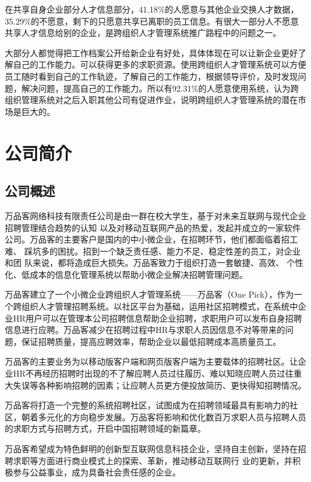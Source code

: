 \documentclass[UTF8]{ctexart}
\begin{document}
在共享自身企业部分人才信息部分，41.18\%的人愿意与其他企业交换人才数据，35.29\%的不愿意，剩下的只愿意共享已离职的员工信息。有很大一部分人不愿意共享人才信息给别的企业，是跨组织人才管理系统推广路程中的问题之一。

大部分人都觉得把工作档案公开给新企业有好处，具体体现在可以让新企业更好了解自己的工作能力。可以获得更多的求职资源。使用跨组织人才管理系统可以方便员工随时看到自己的工作轨迹，了解自己的工作能力，根据领导评价，及时发现问题，解决问题，提高自己的工作能力。所以有92.31\%的人愿意使用系统，认为跨组织管理系统对之后入职其他公司有促进作业，说明跨组织人才管理系统的潜在市场是巨大的。

\newpage\section{公司简介}
\subsection{公司概述}
万品客网络科技有限责任公司是由一群在校大学生，基于对未来互联网与现代企业招聘管理结合趋势的认知 以及对移动互联网产品的热爱，发起并成立的一家软件公司。万品客的主要客户是国内的中小微企业，在招聘环节，他们都面临着招工难、 踩坑多的困扰。招到一个缺乏责任感、能力不足、稳定性差的员工，对企业和团 队来说，都将造成巨大损失。万品客致力于组织打造一套敏捷、高效、 个性化、低成本的信息化管理系统以帮助小微企业解决招聘管理问题。

万品客建立了一个小微企业跨组织人才管理系统——万品客（One Pick），作为一个跨组织人才管理招聘系统。以社区平台为基础，运用社区招聘模式，在系统中企业HR用户可以在管理本公司招聘信息帮助企业招聘，求职用户可以发布自身招聘信息进行应聘。万品客减少在招聘过程中HR与求职人员因信息不对等带来的问题，保证招聘质量，提高应聘效率，帮助企业以最低招聘成本高质量员工。

万品客的主要业务为以移动版客户端和网页版客户端为主要载体的招聘社区。让企业HR不再经历招聘时出现的不了解应聘人员过往履历、难以知晓应聘人员过往重大失误等各种影响招聘的因素；让应聘人员更方便投放简历、更快得知招聘情况。

万品客将打造一个完整的系统招聘社区，试图成为在招聘领域最具有影响力的社区，朝着多元化的方向稳步发展。万品客将影响和优化数百万求职人员与招聘人员的求职方式与招聘方式，开启中国招聘领域的新篇章。

万品客希望成为特色鲜明的创新型互联网信息科技企业，坚持自主创新，坚持在招聘求职等方面进行商业模式上的探索、革新，推动移动互联网行 业的更新，并积极参与公益事业，成为具备社会责任感的企业。
\end{document}
